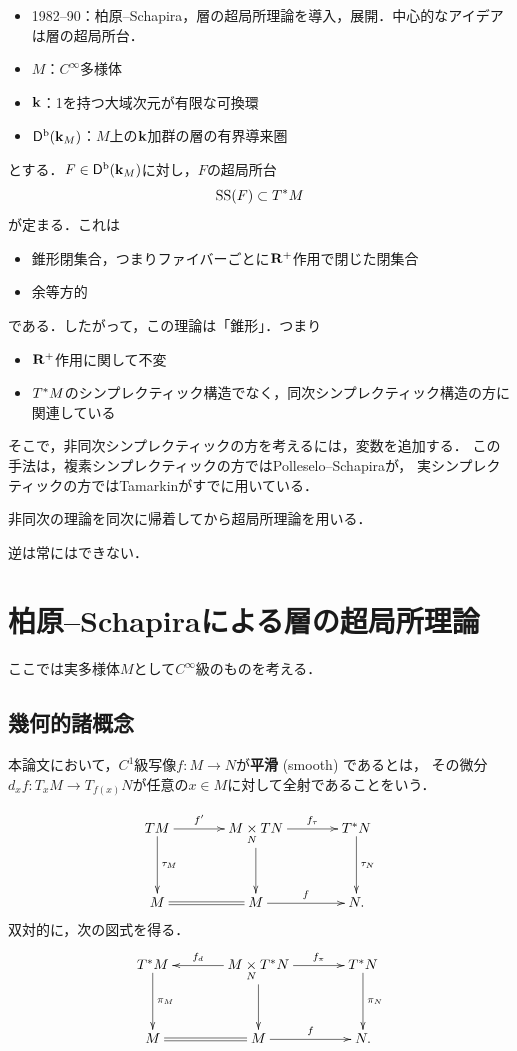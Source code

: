 \begin{itemize}
    \item 1982--90：柏原--Schapira，層の超局所理論を導入，展開．中心的なアイデアは層の超局所台．
    \item \(M\)：\(C^\infty\)多様体
    \item \(\kk\)：1を持つ大域次元が有限な可換環
    \item \(\Dompb(\kk_M)\)：\(M\)上の\(\kk\)加群の層の有界導来圏
\end{itemize}
とする．\(F\in\Dompb(\kk_M)\)に対し，\(F\)の超局所台
\[
    \muS(F)\subset\cotb[M]
\]
が定まる．これは
\begin{itemize}
    \item 錐形閉集合，つまりファイバーごとに\(\rr^{+}\)作用で閉じた閉集合
    \item 余等方的
\end{itemize}
である．したがって，この理論は「錐形」．つまり
\begin{itemize}
    \item \(\rr^{+}\)作用に関して不変
    \item \(\cotb[M]\)のシンプレクティック構造でなく，同次シンプレクティック構造の方に関連している
\end{itemize}
そこで，非同次シンプレクティックの方を考えるには，変数を追加する．
この手法は，複素シンプレクティックの方ではPolleselo--Schapiraが，
実シンプレクティックの方ではTamarkinがすでに用いている．

非同次の理論を同次に帰着してから超局所理論を用いる．

逆は常にはできない．

\section{柏原--Schapira{\cite{KS90}}による層の超局所理論}
ここでは実多様体\(M\)として\(C^\infty\)級のものを考える．
\subsection{幾何的諸概念}
本論文において，\(C^1\)級写像\(
    f\colon M\to N
\)が\textbf{平滑} (smooth) であるとは，
その微分\(
    d_{x}f\colon T_{x}M\to T_{f(x)}N
\)が任意の\(x\in M\)に対して全射であることをいう．


\begin{equation}
    \vcenter{\xymatrix@C=36pt@R=36pt{
    TM
    \ar[d]^-{\tau_M}
    \ar[r]^-{f'}
    &
    M\pb[N] TN
    \ar[d]_-{}
    \ar[r]^-{\mptan[f]}
    &
    \cotb[N]
    \ar[d]^-{\tau_N}
    \\
    M
    \ar@{=}[r]
    &
    M
    \ar[r]^-{f}
    &
    N.
  }}
\end{equation}
双対的に，次の図式を得る．
\begin{equation}
    \vcenter{\xymatrix@C=36pt@R=36pt{
    \cotb[M]
    \ar[d]^-{\pi_M}
    &
    M\pb[N] \cotb[N]
    \ar[d]_-{}
    \ar[r]^-{\mpb[f]}
    \ar[l]_-{\mdiff[f]}
    &
    \cotb[N]
    \ar[d]^-{\pi_N}
    \\
    M
    \ar@{=}[r]
    &
    M
    \ar[r]^-{f}
    &
    N.
  }}
\end{equation}

